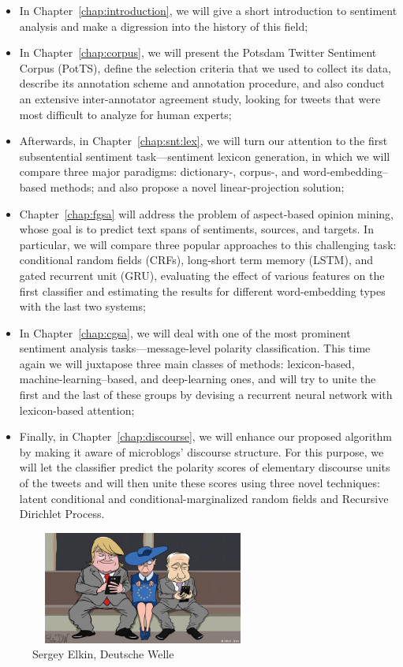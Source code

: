 \begin{itemize}
\item In Chapter~\ref{chap:introduction}, we will give a short
  introduction to sentiment analysis and make a digression into the
  history of this field;

\item In Chapter~\ref{chap:corpus}, we will present the Potsdam
  Twitter Sentiment Corpus (PotTS), define the selection criteria that
  we used to collect its data, describe its annotation scheme and
  annotation procedure, and also conduct an extensive inter-annotator
  agreement study, looking for tweets that were most difficult to
  analyze for human experts;

\item Afterwards, in Chapter~\ref{chap:snt:lex}, we will turn our
  attention to the first subsentential sentiment task---sentiment
  lexicon generation, in which we will compare three major paradigms:
  dictionary-, corpus-, and word-embedding--based methods; and also
  propose a novel linear-projection solution;

\item Chapter~\ref{chap:fgsa} will address the problem of aspect-based
  opinion mining, whose goal is to predict text spans of sentiments,
  sources, and targets.  In particular, we will compare three popular
  approaches to this challenging task: conditional random fields
  (CRFs), long-short term memory (LSTM), and gated recurrent unit
  (GRU), evaluating the effect of various features on the first
  classifier and estimating the results for different word-embedding
  types with the last two systems;

\item In Chapter~\ref{chap:cgsa}, we will deal with one of the most
  prominent sentiment analysis tasks---message-level polarity
  classification.  This time again we will juxtapose three main
  classes of methods: lexicon-based, machine-learning--based, and
  deep-learning ones, and will try to unite the first and the last of
  these groups by devising a recurrent neural network with
  lexicon-based attention;

\item Finally, in Chapter~\ref{chap:discourse}, we will enhance our
  proposed algorithm by making it aware of microblogs' discourse
  structure.  For this purpose, we will let the classifier predict the
  polarity scores of elementary discourse units of the tweets and will
  then unite these scores using three novel techniques: latent
  conditional and conditional-marginalized random fields and Recursive
  Dirichlet Process.
\end{itemize}
\vfill
\begin{figure}[htb!]
  \centering \includegraphics[width=20em,height=10em]{img/putin-trump.jpg}
  \caption*{\textcopyright Sergey Elkin, Deutsche Welle}
\end{figure}
